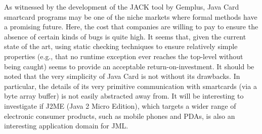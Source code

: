 As witnessed by the development of the JACK tool by Gemplus, Java Card
smartcard programs may be one of the niche markets where formal
methods have a promising future. Here, the cost that companies are
willing to pay to ensure the absence of certain kinds of bugs is quite
high.  It seems that, given the current state of the art, using static
checking techniques to ensure relatively simple properties (e.g., that
no runtime exception ever reaches the top-level without being caught)
seems to provide an acceptable return-on-investment.  It should be
noted that the very simplicity of Java Card is not without its
drawbacks.  In particular, the details of its very primitive
communication with smartcards (via a byte array buffer) is not easily
abstracted away from.  It will be interesting to investigate if J2ME (Java 2
Micro Edition), which targets a wider range of electronic consumer
products, such as mobile phones and PDAs, is also an interesting
application domain for JML\@.



